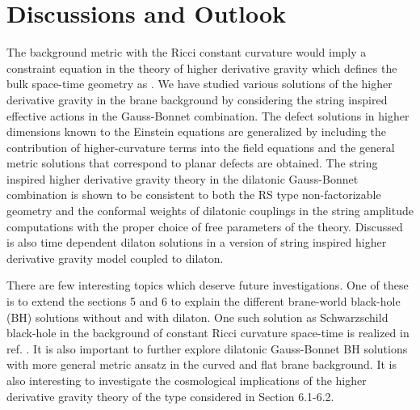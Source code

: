\documentclass[a4paper,12pt]{article}
\begin{document}
\section{Discussions and Outlook}
The background metric with the Ricci constant curvature would imply  a 
constraint equation in the theory of higher derivative gravity which defines  
the bulk space-time geometry as \coordHE{}. We have studied various solutions 
of the higher derivative gravity in the brane background by considering the 
string inspired effective actions in the Gauss-Bonnet combination. The defect 
solutions in higher dimensions known to the Einstein equations are 
generalized by including the contribution of higher-curvature terms into 
the field equations and the general metric solutions that correspond to 
planar defects are obtained. The string inspired higher derivative gravity 
theory in the dilatonic Gauss-Bonnet combination is shown to be consistent 
to both the RS type non-factorizable geometry and the conformal weights of 
dilatonic couplings in the string amplitude computations with the proper 
choice of free parameters of the theory. Discussed is also time dependent 
dilaton solutions in a version of string inspired higher derivative gravity 
model coupled to dilaton.
 
There are few interesting topics which deserve future investigations. One 
of these is to extend the sections 5 and 6 to explain 
the different brane-world black-hole (BH) solutions without and with dilaton. 
One such solution as Schwarzschild \coordHE{} black-hole in the background of 
constant Ricci curvature space-time is realized in ref. \cite{SNS}. 
It is also important to further explore dilatonic Gauss-Bonnet BH solutions 
with more general metric ansatz in the curved and flat brane background. It 
is also interesting to investigate the cosmological implications of the 
higher derivative gravity theory of the type considered in Section 6.1-6.2. 
\end{document}
